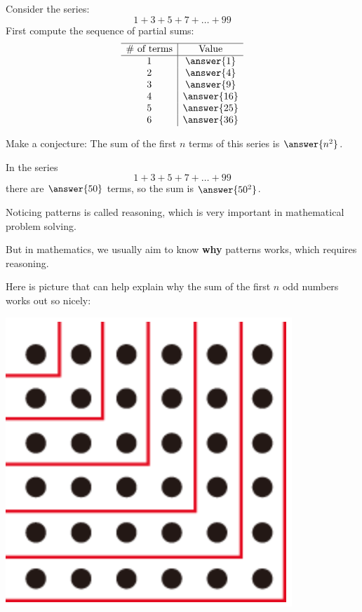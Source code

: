 \documentclass[nooutcomes]{ximera}
\begin{document}
\begin{problem}
Consider the series: 
\[
1+3+5+7+\dots+99
\]
First compute the sequence of partial sums: 
\[
\begin{array}{c|c} \hline
\text{\# of terms} & \text{Value} \\ \hline
1 & \answer{1} \\
2 & \answer{4} \\
3 & \answer{9}\\
4 & \answer{16}\\
5 & \answer{25}\\
6 & \answer{36}\\
\end{array}
\]
\begin{problem}
Make a conjecture: The sum of the first $n$ terms of this series is $\answer{n^2}$. 

In the series
\[
1+3+5+7+\dots+99
\]
there are $\answer{50}$ terms, so the sum is $\answer{50^2}$.  

\begin{problem}
Noticing patterns is called 
reasoning, which is very important in mathematical problem solving. 

But in mathematics, we usually aim to know \textbf{why} patterns works, which requires  
 reasoning.  

Here is picture that can help explain why the sum of the first $n$ odd numbers works out so nicely: 
\begin{image}
\includegraphics[scale=0.5]{sumOdds.png}
\end{image}


\end{problem}
\end{problem}
\end{problem}
\end{document}
